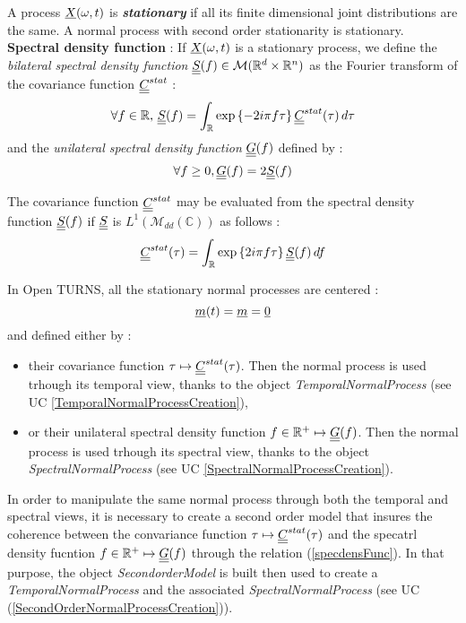  A process ${\underline{X}}(\omega,t)$ is \emph{ \bf stationary} if all its finite dimensional joint distributions  are the same. A normal process with second order stationarity is stationary.\\
 

{\bf Spectral density function} :  If ${\underline{X}}(\omega,t)$  is a stationary process, we  define the \emph{ bilateral spectral density function} ${\underline{\underline{S}}}(f) \in \mathcal{M}(\mathbb{R}^d \times \mathbb{R}^n)$ as the Fourier transform of the covariance function ${\underline{\underline{C}}}^{stat}$ :
\begin{equation} \label{specdensFunc}
  \forall f \in \mathbb{R}, \, {\underline{\underline{S}}}(f) = \int_{\mathbb{R}}\exp\left\{  -2i\pi f \tau \right\} {\underline{\underline{C}}}^{stat}(\tau)\, d\tau
\end{equation}
and the  \emph{ unilateral spectral density function} ${\underline{\underline{G}}}(f)$ defined by : 
\begin{equation}\label{univG}
  \forall f \geq 0, {\underline{\underline{G}}}(f) = 2{\underline{\underline{S}}}(f)
\end{equation}

The  covariance function ${\underline{\underline{C}}}^{stat}$ may be evaluated from the spectral density function ${\underline{\underline{S}}}(f)$  if ${\underline{\underline{S}}}$ is $L^1(\mathcal{M}_{dd}(\mathbb{C}))$ as follows :
\begin{equation} \label{cspectransform}
  {\underline{\underline{C}}}^{stat}(\tau)  = \int_{\mathbb{R}}\exp\left\{  2i\pi f \tau \right\} {\underline{\underline{S}}}(f)\, df
\end{equation}




 In Open TURNS, all the stationary normal processes are centered : 
 \begin{equation}
 {\underline{m}}(t)   = {\underline{m}} = {\underline{0}}
 \end{equation}
and  defined either by : 
\begin{itemize} 
  \item their covariance function  $\tau \mapsto {\underline{\underline{C}}}^{stat}(\tau)$. Then the normal process is used trhough its temporal view, thanks to the object {\itshape TemporalNormalProcess} (see UC \ref{TemporalNormalProcessCreation}),
  \item or their unilateral spectral density function $f \in \mathbb{R}^+ \mapsto {\underline{\underline{G}}}(f)$. Then the normal process is used trhough its spectral view, thanks to the object {\itshape SpectralNormalProcess} (see UC \ref{SpectralNormalProcessCreation}).
\end{itemize}

In order to manipulate the same normal process through both the temporal and spectral views, it is necessary to create a second order model that insures the coherence between the convariance function $\tau \mapsto {\underline{\underline{C}}}^{stat}(\tau)$ and the specatrl density fucntion  $f \in \mathbb{R}^+ \mapsto {\underline{\underline{G}}}(f)$ through the relation (\ref{specdensFunc}). In that purpose, the object {\itshape SecondorderModel} is built then used to create a {\itshape TemporalNormalProcess} and the associated {\itshape SpectralNormalProcess} (see UC (\ref{SecondOrderNormalProcessCreation})).
